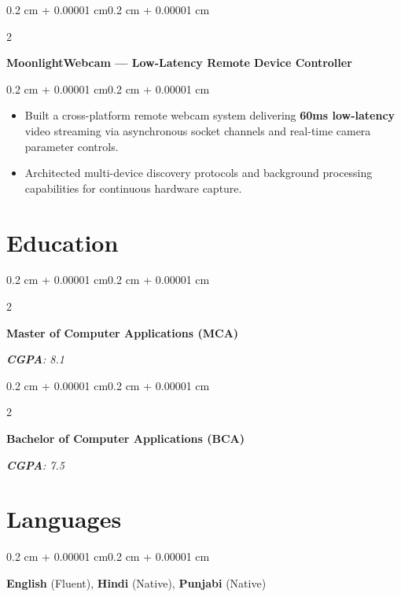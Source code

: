 \documentclass[10pt, a4paper]{article}
\newenvironment{highlights}{
    \begin{itemize}[
        topsep=0.06 cm,
        parsep=0.05 cm,
        partopsep=0pt,
        itemsep=0pt,
        leftmargin=0.4 cm + 10pt
    ]
}{
    \end{itemize}
}
\newenvironment{onecolentry}{
    \begin{adjustwidth}{0.2 cm + 0.00001 cm}{0.2 cm + 0.00001 cm}
}{
    \end{adjustwidth}
}
\newenvironment{twocolentry}[2][]{
    \onecolentry
    \def\secondColumn{#2}
    \setcolumnwidth{\fill, 4.5 cm}
    \begin{paracol}{2}
}{
    \switchcolumn \raggedleft \secondColumn
    \end{paracol}
    \endonecolentry
}
\let\hrefWithoutArrow\href
\renewcommand{\href}[2]{\hrefWithoutArrow{#1}{\ifthenelse{\equal{#2}{}}{ }{#2 }\raisebox{.15ex}{\footnotesize \faExternalLink*}}}
\begin{document}
\begin{twocolentry}{\textit{\href{https://github.com/I-am-Manu-Singh/MoonlightWebcam}{\underline{Repo}}}}
    \textbf{MoonlightWebcam — Low-Latency Remote Device Controller}
\end{twocolentry}
\vspace{0.06 cm}
\begin{onecolentry}
    \begin{highlights}
    \item Built a cross-platform remote webcam system delivering \textbf{60ms low-latency} video streaming via asynchronous socket channels and real-time camera parameter controls.
    \item Architected multi-device discovery protocols and background processing capabilities for continuous hardware capture.
    \end{highlights}
\end{onecolentry}

\section{Education}
\begin{twocolentry}{\textit{\textbf{CGPA}: 8.1}}
    \textbf{Master of Computer Applications (MCA)} 
\end{twocolentry}
\vspace{0.04 cm}
\begin{twocolentry}{\textit{\textbf{CGPA}: 7.5}}
    \textbf{Bachelor of Computer Applications (BCA)} 
\end{twocolentry}

\section{Languages}
\begin{onecolentry}
\textbf{English} (Fluent), \textbf{Hindi} (Native), \textbf{Punjabi} (Native)
\end{onecolentry}
\end{document}
